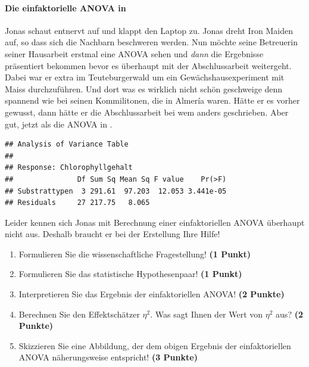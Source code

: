 \documentclass[a4paper, 9pt]{scrartcl}\usepackage[]{graphicx}\usepackage[]{xcolor}
\makeatletter
\newenvironment{kframe}{%
 \def\at@end@of@kframe{}%
 \ifinner\ifhmode%
  \def\at@end@of@kframe{\end{minipage}}%
  \begin{minipage}{\columnwidth}%
 \fi\fi%
 \def\FrameCommand##1{\hskip\@totalleftmargin \hskip-\fboxsep
 \colorbox{shadecolor}{##1}\hskip-\fboxsep
     \hskip-\linewidth \hskip-\@totalleftmargin \hskip\columnwidth}%
 \MakeFramed {\advance\hsize-\width
   \@totalleftmargin\z@ \linewidth\hsize
   \@setminipage}}%
 {\par\unskip\endMakeFramed%
 \at@end@of@kframe}
\newenvironment{knitrout}{}{} %
\makeatother
\begin{document}
\ifcollection
\paragraph{Die einfaktorielle ANOVA in \Rlogo}
\fi

Jonas schaut entnervt auf und klappt den Laptop zu. Jonas dreht Iron Maiden auf, so dass sich die Nachbarn beschweren werden. Nun möchte seine Betreuerin seiner Hausarbeit erstmal eine ANOVA sehen und \textit{dann} die Ergebnisse präsentiert bekommen bevor es überhaupt mit der Abschlussarbeit weitergeht. Dabei war er extra im Teuteburgerwald um ein Gewächshausexperiment mit Maiss durchzuführen. Und dort was es wirklich nicht schön geschweige denn spannend wie bei seinen Kommilitonen, die in Almería waren. Hätte er es vorher gewusst, dann hätte er die Abschlussarbeit bei wem anders geschrieben. Aber gut, jetzt als die ANOVA in \Rlogo.

\begin{knitrout}
\color{fgcolor}\begin{kframe}
\begin{verbatim}
## Analysis of Variance Table
## 
## Response: Chlorophyllgehalt
##               Df Sum Sq Mean Sq F value    Pr(>F)
## Substrattypen  3 291.61  97.203  12.053 3.441e-05
## Residuals     27 217.75   8.065
\end{verbatim}
\end{kframe}
\end{knitrout}

\vspace{1ex}

Leider kennen sich Jonas mit Berechnung einer einfaktoriellen ANOVA überhaupt nicht aus. Deshalb braucht er bei der Erstellung Ihre Hilfe! 

\begin{enumerate}
  \item Formulieren Sie die wissenschaftliche Fragestellung! \textbf{(1 Punkt)}
  \item Formulieren Sie das statistische Hypothesenpaar! \textbf{(1 Punkt)}
\item Interpretieren Sie das Ergebnis der einfaktoriellen ANOVA! \textbf{(2 Punkte)} 
\item Berechnen Sie den Effektschätzer $\eta^2$. Was sagt Ihnen der Wert von $\eta^2$ aus? \textbf{(2 Punkte)}
\item Skizzieren Sie eine Abbildung, der dem obigen Ergebnis der
  einfaktoriellen ANOVA näherungsweise entspricht! \textbf{(3 Punkte)}
\end{enumerate}
\end{document}
